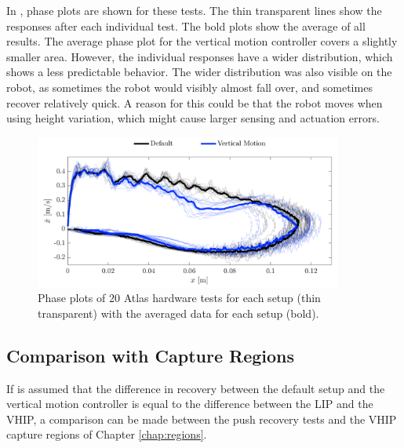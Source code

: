 In , phase plots are shown for these tests. The thin transparent lines show the responses after each individual test. The bold plots show the average of all results. The average phase plot for the vertical motion controller covers a slightly smaller area. However, the individual responses have a wider distribution, which shows a less predictable behavior. The wider distribution was also visible on the robot, as sometimes the robot would visibly almost fall over, and sometimes recover relatively quick. A reason for this could be that the robot moves when using height variation, which might cause larger sensing and actuation errors.

\begin{figure}
\centering
\includegraphics[width=0.9\textwidth]{STYLESTUFF/atlasphaseHW.png}
\caption{Phase plots of $20$ Atlas hardware tests for each setup (thin transparent) with the averaged data for each setup (bold).}
\label{fig:atlasphaseHW}
\end{figure}

\subsection{Comparison with Capture Regions}
If is assumed that the difference in recovery between the default setup and the vertical motion controller is equal to the difference between the LIP and the \ac{VHIP}, a comparison can be made between the push recovery tests and the \ac{VHIP} capture regions of Chapter \ref{chap:regions}.


